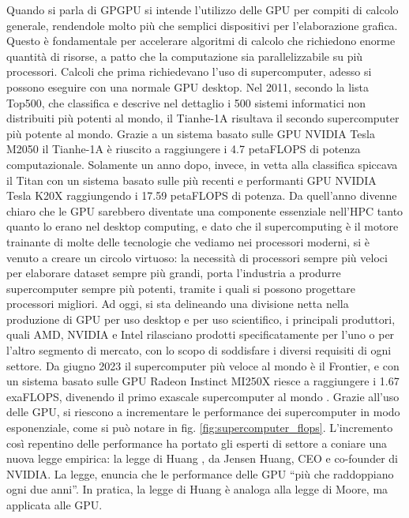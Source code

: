 Quando si parla di \gls{GPGPU} si intende l'utilizzo delle \gls{GPU} per compiti di calcolo generale, rendendole molto più che semplici dispositivi per l'elaborazione grafica. Questo è fondamentale per accelerare algoritmi di calcolo che richiedono enorme quantità di risorse, a patto che la computazione sia parallelizzabile su più processori.
Calcoli che prima richiedevano l'uso di supercomputer, adesso si possono eseguire con una normale \gls{GPU} desktop.
Nel 2011, secondo la lista Top500, che classifica e descrive nel dettaglio i 500 sistemi informatici non distribuiti più potenti al mondo, il Tianhe-1A risultava il secondo supercomputer più potente al mondo. Grazie a un sistema basato sulle \gls{GPU} NVIDIA Tesla M2050 \cite[]{Tianhe-1A:link} il Tianhe-1A è riuscito a raggiungere i 4.7 petaFLOPS di potenza computazionale. Solamente un anno dopo, invece, in vetta alla classifica spiccava il Titan \cite[]{Titan:link} con un sistema basato sulle più recenti e performanti \gls{GPU} NVIDIA Tesla K20X raggiungendo i 17.59 petaFLOPS di potenza.
Da quell'anno divenne chiaro che le \gls{GPU} sarebbero diventate una componente essenziale nell'\gls{HPC} tanto quanto lo erano nel desktop computing, e dato che il supercomputing è il motore trainante di molte delle tecnologie che vediamo nei processori moderni, si è venuto a creare un circolo virtuoso: la necessità di processori sempre più veloci per elaborare dataset sempre più grandi, porta l'industria a produrre supercomputer sempre più potenti, tramite i quali si possono progettare processori migliori. Ad oggi, si sta delineando una divisione netta nella produzione di \gls{GPU} per uso desktop e per uso scientifico, i principali produttori, quali AMD, NVIDIA e Intel rilasciano prodotti specificatamente per l'uno o per l'altro segmento di mercato, con lo scopo di soddisfare i diversi requisiti di ogni settore. Da giugno 2023 il supercomputer più veloce al mondo è il Frontier, e con un sistema basato sulle \gls{GPU} Radeon Instinct MI250X riesce a raggiungere i 1.67 exaFLOPS, divenendo il primo exascale supercomputer al mondo \cite[]{Frontier:link}. Grazie all'uso delle \gls{GPU}, si riescono a incrementare le performance dei supercomputer in modo esponenziale, come si può notare in fig. \ref{fig:supercomputer_flops}. L'incremento così repentino delle performance ha portato gli esperti di settore a coniare una nuova legge empirica: la legge di Huang \cite[]{Huang:law}, da Jensen Huang, CEO e co-founder di NVIDIA. La legge, enuncia che le performance delle \gls{GPU} ``più che raddoppiano ogni due anni''. In pratica, la legge di Huang è analoga alla legge di Moore, ma applicata alle GPU.

